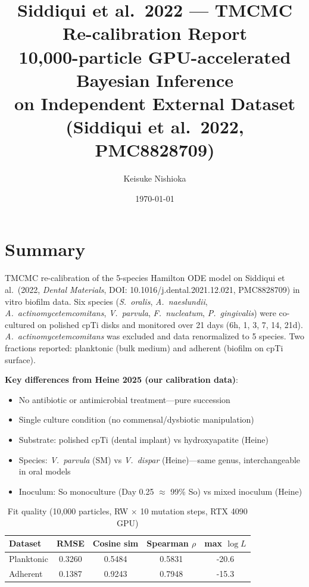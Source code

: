 \documentclass[11pt,a4paper]{article}
\title{Siddiqui et al.\ 2022 --- TMCMC Re-calibration Report\\[4pt]
\large 10,000-particle GPU-accelerated Bayesian Inference\\[2pt]
\normalsize on Independent External Dataset (Siddiqui et al.\ 2022, PMC8828709)}
\author{Keisuke Nishioka}
\date{\today}
\begin{document}
\maketitle

\section{Summary}

TMCMC re-calibration of the 5-species Hamilton ODE model on
Siddiqui et al.\ (2022, \textit{Dental Materials}, DOI: 10.1016/j.dental.2021.12.021, PMC8828709)
in vitro biofilm data.
Six species (\textit{S.\ oralis}, \textit{A.\ naeslundii}, \textit{A.\ actinomycetemcomitans},
\textit{V.\ parvula}, \textit{F.\ nucleatum}, \textit{P.\ gingivalis}) were co-cultured on
polished cpTi disks and monitored over 21 days (6h, 1, 3, 7, 14, 21d).
\textit{A.\ actinomycetemcomitans} was excluded and data renormalized to 5 species.
Two fractions reported: planktonic (bulk medium) and adherent (biofilm on cpTi surface).

\textbf{Key differences from Heine 2025 (our calibration data)}:
\begin{itemize}
\item No antibiotic or antimicrobial treatment---pure succession
\item Single culture condition (no commensal/dysbiotic manipulation)
\item Substrate: polished cpTi (dental implant) vs hydroxyapatite (Heine)
\item Species: \textit{V.\ parvula} (SM) vs \textit{V.\ dispar} (Heine)---same genus, interchangeable in oral models
\item Inoculum: So monoculture (Day 0.25 $\approx$ 99\% So) vs mixed inoculum (Heine)
\end{itemize}

\begin{table}[H]
\centering
\caption{Fit quality (10,000 particles, RW $\times$ 10 mutation steps, RTX 4090 GPU)}
\label{tab:metrics}
\begin{tabular}{lcccc}
\toprule
Dataset & RMSE & Cosine sim & Spearman $\rho$ & max $\log L$ \\
\midrule
Planktonic & 0.3260 & 0.5484 & 0.5831 & -20.6 \\
Adherent   & 0.1387 & 0.9243 & 0.7948 & -15.3 \\
\bottomrule
\end{tabular}
\end{table}
\end{document}
